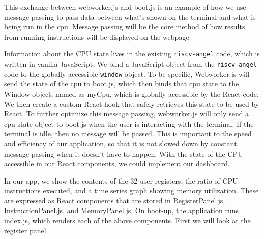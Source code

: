This exchange between webworker.js and boot.js is an example of how we use message passing
to pass data between what's shown on the terminal and what is being run in the cpu. Message passing
will be the core method of how results from running instructions will be displayed on the webpage.

Information about the CPU state lives in the existing \texttt{riscv-angel} code, which is written in
vanilla JavaScript. We bind a JavaScript object from the
\texttt{riscv-angel} code
to the globally accessible \texttt{window} object.
To be specific, Webworker.js will send the state of the cpu to boot.js, which then binds that cpu state
to the Window object, named as myCpu, which is globally accessible by the React code.
We then create a custom React hook that safely retrieves this state to be used by React.
To further optimize this message passing, webworker.js will only send a cpu state object to boot.js
when the user is interacting with the terminal. If the terminal is idle, then no message will be passed.
This is important to the speed and efficiency of our application, so that it is not slowed down
by constant message passing when it doesn't have to happen.
With the state of the CPU accessible in our React components, we could implement our
dashboard.

In our app, we show the contents of the 32 user registers, the ratio of CPU instructions executed,
and a time series graph showing memory utilization. These are expressed as React components that are
stored in RegisterPanel.js, InstructionPanel.js, and MemoryPanel.js. On boot-up, the application
runs index.js, which renders each of the above components. First we will look at the register panel.

